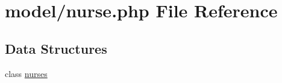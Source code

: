 \hypertarget{nurse_8php}{}\section{model/nurse.php File Reference}
\label{nurse_8php}
\subsection*{Data Structures}
\begin{DoxyCompactItemize}
\item 
class \hyperlink{classnurses}{nurses}
\end{DoxyCompactItemize}
